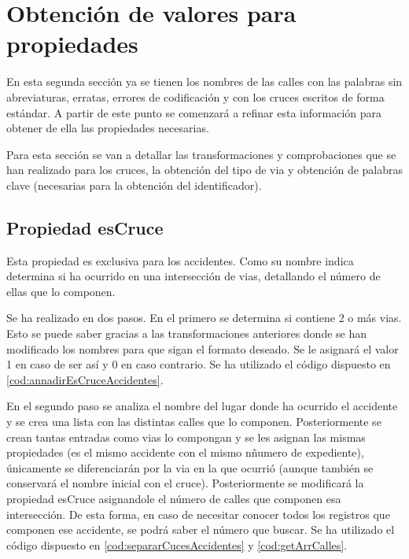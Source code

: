 \section{Obtención de valores para propiedades}

En esta segunda sección ya se tienen los nombres de las calles con las palabras sin abreviaturas, erratas, errores de codificación y con los cruces escritos de forma estándar. A partir de este punto se comenzará a refinar esta información para obtener de ella las propiedades necesarias.

Para esta sección se van a detallar las transformaciones y comprobaciones que se han realizado para los cruces, la obtención del tipo de via y obtención de palabras clave (necesarias para la obtención del identificador).



\subsection{Propiedad esCruce}

Esta propiedad es exclusiva para los accidentes. Como su nombre indica determina si ha ocurrido en una intersección de vias, detallando el número de ellas que lo componen.

Se ha realizado en dos pasos. En el primero se determina si contiene 2 o más vias. Esto se puede saber gracias a las transformaciones anteriores donde se han modificado los nombres para que sigan el formato deseado. Se le asignará el valor 1 en caso de ser así y 0 en caso contrario. Se ha utilizado el código dispuesto en \ref{cod:annadirEsCruceAccidentes}.




En el segundo paso se analiza el nombre del lugar donde ha ocurrido el accidente y se crea una lista con las distintas calles que lo componen. Posteriormente se crean tantas entradas como vias lo compongan y se les asignan las mismas propiedades (es el mismo accidente con el mismo nñumero de expediente), únicamente se diferenciarán por la via en la que ocurrió (aunque también se conservará el nombre inicial con el cruce). Posteriormente se modificará la propiedad esCruce asignandole el número de calles que componen esa intersección. De esta forma, en caso de necesitar conocer todos los registros que componen ese accidente, se podrá saber el número que buscar. Se ha utilizado el código dispuesto en \ref{cod:separarCucesAccidentes} y \ref{cod:getArrCalles}.

